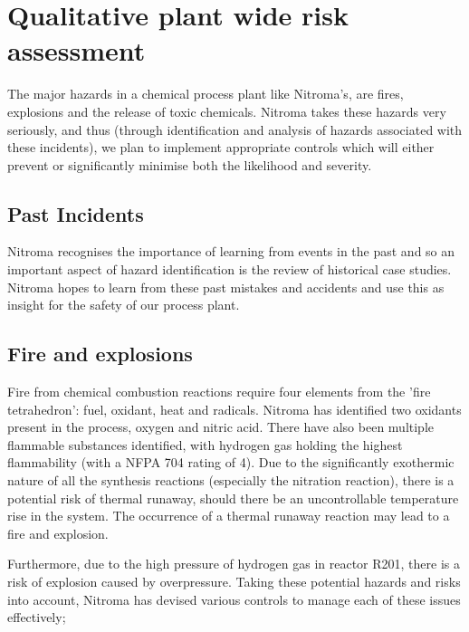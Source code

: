 \section{Qualitative plant wide risk assessment}

The major hazards in  a chemical process plant like Nitroma’s, are fires, explosions and the release of toxic chemicals. Nitroma takes these hazards very seriously, and thus (through identification and analysis of hazards associated with these incidents), we plan to implement appropriate controls which will either prevent or significantly minimise both the likelihood and severity. 

\subsection{Past Incidents}

Nitroma recognises the importance of learning from events in the past and so an important aspect of hazard identification is the review of historical case studies. Nitroma hopes to learn from these past mistakes and accidents and use this as insight for the safety of our process plant.

\subsection{Fire and explosions}

Fire from chemical combustion reactions require four elements from the 'fire tetrahedron': fuel, oxidant, heat and radicals. Nitroma has identified two oxidants present in the process, oxygen and nitric acid. There have also been multiple flammable substances identified, with hydrogen gas holding the highest flammability (with a NFPA 704 rating of 4). Due to the significantly exothermic nature of all the synthesis reactions (especially the nitration reaction), there is a potential risk of thermal runaway, should there be an uncontrollable temperature rise in the system. The occurrence of a thermal runaway reaction may lead to a fire and explosion.  

Furthermore, due to the high pressure of hydrogen gas in reactor R201, there is a risk of explosion caused by overpressure. Taking these potential hazards and risks into account, Nitroma has devised various controls to manage each of these issues effectively; 


